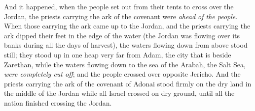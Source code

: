 \begin{biblechapter}
\verse And it happened, when the people set out from their tents to cross over the Jordan, the priests carrying the ark of the covenant were \textit{ahead of the people}.
\verse When those carrying the ark came up to the Jordan, and the priests carrying the ark dipped their feet in the edge of the water (the Jordan was flowing over its banks during all the days of harvest),
\verse the waters flowing down from above stood still; they stood up in one heap very far from Adam, the city that is beside Zarethan, while the waters flowing down to the sea of the Arabah, the Salt Sea, \textit{were completely cut off}; and the people crossed over opposite Jericho.
\verse And the priests carrying the ark of the covenant of Adonai stood firmly on the dry land in the middle of the Jordan while all Israel crossed on dry ground, until all the nation finished crossing the Jordan.
\end{biblechapter}

